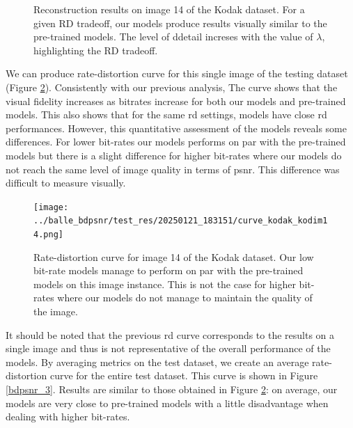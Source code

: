\begin{figure}[H]
    \centering
    \caption{Reconstruction results on image 14 of the Kodak dataset. For a given \acrshort{RD} tradeoff, our models produce results visually similar to the pre-trained models. The level of ddetail increses with the value of \(\lambda\), highlighting the \acrshort{RD} tradeoff.}
    \label{bdpsnr_1}
\end{figure}

We can produce rate-distortion curve for this single image of the testing dataset (Figure \ref{bdpsnr_2}). Consistently with our previous analysis, The curve shows that the visual fidelity increases as bitrates increase for both our models and pre-trained models. This also shows that for the same \acrshort{rd} settings, models have close \acrshort{rd} performances. However, this quantitative assessment of the models reveals some differences. For lower bit-rates our models performs on par with the pre-trained models but there is a slight difference for higher bit-rates where our models do not reach the same level of image quality in terms of \acrshort{psnr}. This difference was difficult to measure visually.

\begin{figure}
    \centering
    \texttt{[image: ../balle\_bdpsnr/test\_res/20250121\_183151/curve\_kodak\_kodim14.png]}
    \caption{Rate-distortion curve for image 14 of the Kodak dataset. Our low bit-rate models manage to perform on par with the pre-trained models on this image instance. This is not the case for higher bit-rates where our models do not manage to maintain the quality of the image.}
    \label{bdpsnr_2}
\end{figure}

It should be noted that the previous \acrshort{rd} curve corresponds to the results on a single image and thus is not representative of the overall performance of the models. By averaging metrics on the test dataset, we create an average rate-distortion curve for the entire test dataset. This curve is shown in Figure \ref{bdpsnr_3}. Results are similar to those obtained in Figure \ref{bdpsnr_2}: on average, our models are very close to pre-trained models with a little disadvantage when dealing with higher bit-rates.

